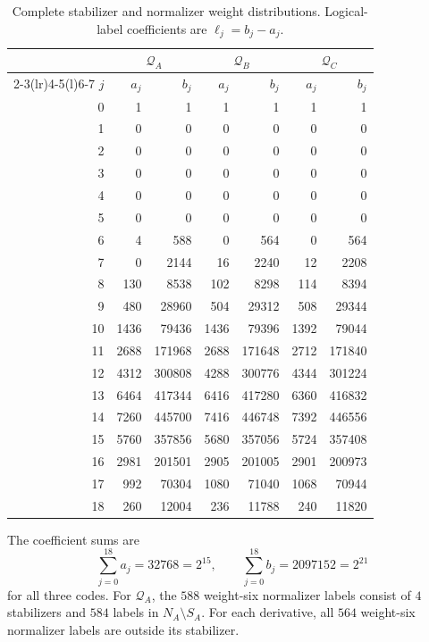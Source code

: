\documentclass[11pt,a4paper]{article}
\newcommand{\CA}{\mathcal Q_A}
\newcommand{\CB}{\mathcal Q_B}
\newcommand{\CC}{\mathcal Q_C}
\begin{document}
\begin{table}[tbp]
\centering\small
\setlength{\tabcolsep}{6pt}
\begin{tabular}{@{}rrrrrrr@{}}\toprule
&\multicolumn{2}{c}{$\CA$}&\multicolumn{2}{c}{$\CB$}&\multicolumn{2}{c}{$\CC$}\\
\cmidrule(lr){2-3}\cmidrule(lr){4-5}\cmidrule(l){6-7}
$j$&$a_j$&$b_j$&$a_j$&$b_j$&$a_j$&$b_j$\\\midrule
0 & 1 & 1 & 1 & 1 & 1 & 1 \\
1 & 0 & 0 & 0 & 0 & 0 & 0 \\
2 & 0 & 0 & 0 & 0 & 0 & 0 \\
3 & 0 & 0 & 0 & 0 & 0 & 0 \\
4 & 0 & 0 & 0 & 0 & 0 & 0 \\
5 & 0 & 0 & 0 & 0 & 0 & 0 \\
6 & 4 & 588 & 0 & 564 & 0 & 564 \\
7 & 0 & 2144 & 16 & 2240 & 12 & 2208 \\
8 & 130 & 8538 & 102 & 8298 & 114 & 8394 \\
9 & 480 & 28960 & 504 & 29312 & 508 & 29344 \\
10 & 1436 & 79436 & 1436 & 79396 & 1392 & 79044 \\
11 & 2688 & 171968 & 2688 & 171648 & 2712 & 171840 \\
12 & 4312 & 300808 & 4288 & 300776 & 4344 & 301224 \\
13 & 6464 & 417344 & 6416 & 417280 & 6360 & 416832 \\
14 & 7260 & 445700 & 7416 & 446748 & 7392 & 446556 \\
15 & 5760 & 357856 & 5680 & 357056 & 5724 & 357408 \\
16 & 2981 & 201501 & 2905 & 201005 & 2901 & 200973 \\
17 & 992 & 70304 & 1080 & 71040 & 1068 & 70944 \\
18 & 260 & 12004 & 236 & 11788 & 240 & 11820 \\
\bottomrule
\end{tabular}
\caption{Complete stabilizer and normalizer weight distributions. Logical-label coefficients are $\ell_j=b_j-a_j$.}\label{tab:enumerators}
\end{table}

The coefficient sums are
\[
 \sum_{j=0}^{18}a_j=32768=2^{15},\qquad
 \sum_{j=0}^{18}b_j=2097152=2^{21}
\]
for all three codes. For $\CA$, the $588$ weight-six normalizer labels consist of $4$ stabilizers and $584$ labels in $N_A\setminus S_A$. For each derivative, all $564$ weight-six normalizer labels are outside its stabilizer.
\end{document}
